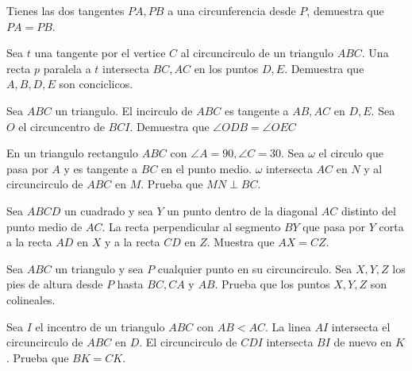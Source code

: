\documentclass[11pt]{scrartcl}
\begin{document}
\begin{problem}
    Tienes las dos tangentes $PA, PB$ a una circunferencia desde $P$, demuestra que $PA=PB$.
\end{problem}
\begin{problem}
    Sea $t$ una tangente por el vertice $C$ al circuncirculo de un triangulo $ABC$. Una recta $p$ paralela a $t$ intersecta $BC,AC$ en los puntos $D,E$. Demuestra que $A,B,D,E$ son conciclicos. 
\end{problem}

\begin{problem}
    Sea $ABC$ un triangulo. El incirculo de $ABC$ es tangente a $AB, AC$ en $D,E$. Sea $O$ el circuncentro de $BCI$. Demuestra que $\angle ODB=\angle OEC$
\end{problem}

\begin{problem}
    En un triangulo rectangulo $ABC$ con $\angle A=90, \angle C=30$. Sea $\omega$ el circulo que pasa por $A$ y es tangente a $BC$ en el punto medio. $\omega$ intersecta $AC$ en $N$ y al circuncirculo de $ABC$ en $M$. Prueba que $MN \perp BC$.
\end{problem}

\begin{problem} 
    Sea $ABCD$ un cuadrado y sea $Y$ un punto dentro de la diagonal $AC$ distinto del punto medio de $AC$. La recta perpendicular al segmento $BY$ que pasa por $Y$ corta a la recta $AD$ en $X$ y a la recta $CD$ en $Z$. Muestra que $AX=CZ$. 
\end{problem}
\begin{problem} 
    Sea $ABC$ un triangulo y sea $P$ cualquier punto en su circuncirculo. Sea $X,Y,Z$ los pies de altura desde $P$ hasta $BC,CA$ y $AB$. Prueba que los puntos $X,Y,Z$ son colineales.
\end{problem}

\begin{problem}
    Sea $I$ el incentro de un triangulo $ABC$ con $AB<AC$. La linea $AI$ intersecta el circuncirculo de $ABC$ en $D$. El circuncirculo de $CDI$ intersecta $BI$ de nuevo en $K$. Prueba que $BK=CK$.
\end{problem}
\end{document}
